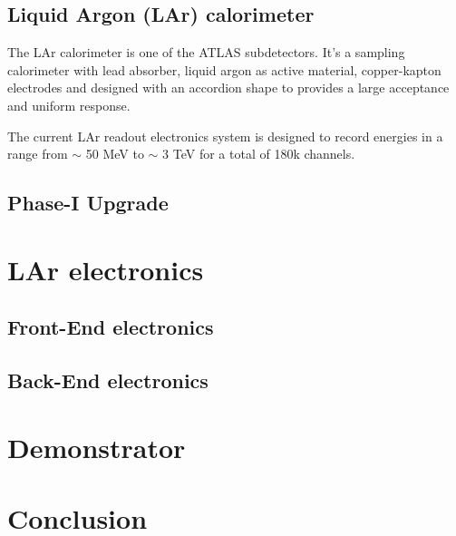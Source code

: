 \documentclass{llncs}
\begin{document}
\subsection{Liquid Argon (LAr) calorimeter}
The LAr calorimeter is one of the ATLAS subdetectors. It's a sampling calorimeter with lead absorber, liquid argon as active material, copper-kapton electrodes and designed with an accordion shape to provides a large acceptance and uniform response.

The current LAr readout electronics system is designed to record energies in a range from $\sim$ 50 MeV to $\sim$ 3 TeV for a total of 180k channels.

\subsection{Phase-I Upgrade}

\section{LAr electronics}
\subsection{Front-End electronics}

\subsection{Back-End electronics}

\section{Demonstrator}

\section{Conclusion}
\end{document}
